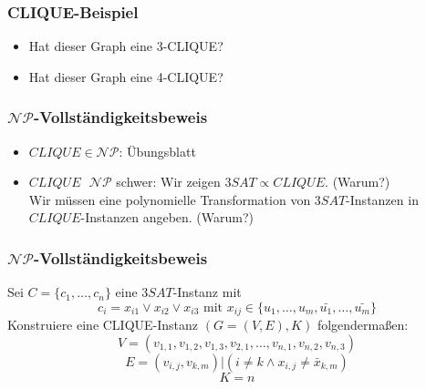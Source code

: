 \begin{frame}
\frametitle{CLIQUE-Beispiel}

\begin{figure}[H]
\end{figure}
\begin{itemize}
\item Hat dieser Graph eine 3-CLIQUE?\pause
\item Hat dieser Graph eine 4-CLIQUE?
\end{itemize}
\end{frame}

\begin{frame}
\frametitle{$\mathcal{NP}$-Vollständigkeitsbeweis}
\begin{itemize}
 \item $CLIQUE \in \mathcal{NP}$: Übungsblatt\\
 \item $CLIQUE\mbox{ } \mathcal{NP}$ schwer: Wir zeigen $3SAT \propto CLIQUE$. (Warum?)\\\invincible\pause
 Wir müssen eine polynomielle Transformation von $3SAT$-Instanzen in $CLIQUE$-Instanzen angeben. (Warum?)\\ \vincible
\end{itemize}
\end{frame}

\begin{frame}
\frametitle{$\mathcal{NP}$-Vollständigkeitsbeweis}
Sei $C = \{c_1, \ldots, c_n\}$ eine $3SAT$-Instanz mit 
$$ c_i = x_{i1} \vee x_{i2} \vee x_{i3} \mbox{ mit } x_{ij} \in \{u_1,\ldots,u_m,\bar{u_1},\ldots,\bar{u_m}\} $$
Konstruiere eine CLIQUE-Instanz $(G = (V, E), K)$ folgendermaßen:
$$V = (v_{1,1}, v_{1,2}, v_{1,3}, v_{2,1},\ldots,v_{n,1},v_{n,2},v_{n,3})$$
$$E = {(v_{i,j},v_{k,m})| (i \neq k \wedge x_{i,j} \neq \bar{x}_{k,m} )}$$%
$$K = n$$
\end{frame}

